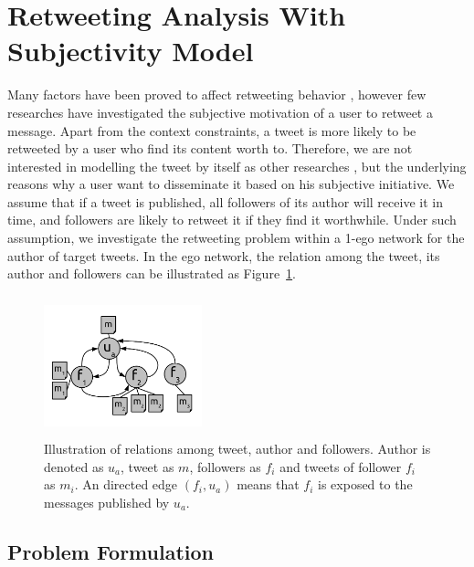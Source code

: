 \documentclass[letterpaper]{article}
\begin{document}
\section{Retweeting Analysis With Subjectivity Model}

Many factors have been proved to affect retweeting behavior \cite{suh2010want,macskassy2011people,comarela2012understanding}, however few researches have investigated the subjective motivation of a user to retweet a message. 
Apart from the context constraints, a tweet is more likely to be retweeted by a user who find its content worth to. 
Therefore, we are not interested in modelling the tweet by itself as other researches \cite{naveed2011searching,pfitzner2012emotional}, but the underlying reasons why a user want to disseminate it based on his subjective initiative. 
We assume that if a tweet is published, all followers of its author will receive it in time, and followers are likely to retweet it if they find it worthwhile. 
Under such assumption, we investigate the retweeting problem within a 1-ego network for the author of target tweets. 
In the ego network, the relation among the tweet, its author and followers can be illustrated as Figure~\ref{fig1}.
\begin{figure}[htb]
\centering
\includegraphics[width=1.8in,height=1.6in]{ego.pdf}
\caption{Illustration of relations among tweet, author and followers. Author is denoted as $ u_{a} $, tweet as $ m $, followers as $ f_{i} $ and tweets of follower $ f_{i} $ as $ m_{i} $. An directed edge $ \left( f_{i},u_{a} \right)  $ means that $ f_{i} $ is exposed to the messages published by $ u_{a} $.}
\label{fig1}
\end{figure}

\subsection{Problem Formulation}
\label{formulation}
\end{document}
